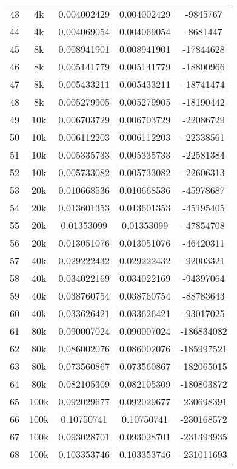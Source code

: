 \begin{center}
\begin{longtable}{|c|c|c|c|c|}
		43 & 4k & 0.004002429 & 0.004002429 & -9845767\\
		44 & 4k & 0.004069054 & 0.004069054 & -8681447\\
		\hline
		45 & 8k & 0.008941901 & 0.008941901 & -17844628\\
		46 & 8k & 0.005141779 & 0.005141779 & -18800966\\
		47 & 8k & 0.005433211 & 0.005433211 & -18741474\\
		48 & 8k & 0.005279905 & 0.005279905 & -18190442\\
		\hline
		49 & 10k & 0.006703729 & 0.006703729 & -22086729\\
		50 & 10k & 0.006112203 & 0.006112203 & -22338561\\
		51 & 10k & 0.005335733 & 0.005335733 & -22581384\\
		52 & 10k & 0.005733082 & 0.005733082 & -22606313\\
		\hline
		53 & 20k & 0.010668536 & 0.010668536 & -45978687\\
		54 & 20k & 0.013601353 & 0.013601353 & -45195405\\
		55 & 20k & 0.01353099 & 0.01353099 & -47854708\\
		56 & 20k & 0.013051076 & 0.013051076 & -46420311\\
		\hline
		57 & 40k & 0.029222432 & 0.029222432 & -92003321\\
		58 & 40k & 0.034022169 & 0.034022169 & -94397064\\
		59 & 40k & 0.038760754 & 0.038760754 & -88783643\\
		60 & 40k & 0.033626421 & 0.033626421 & -93017025\\
		\hline
		61 & 80k & 0.090007024 & 0.090007024 & -186834082\\
		62 & 80k & 0.086002076 & 0.086002076 & -185997521\\
		63 & 80k & 0.073560867 & 0.073560867 & -182065015\\
		64 & 80k & 0.082105309 & 0.082105309 & -180803872\\
		\hline
		65 & 100k & 0.092029677 & 0.092029677 & -230698391\\
		66 & 100k & 0.10750741 & 0.10750741 & -230168572\\
		67 & 100k & 0.093028701 & 0.093028701 & -231393935\\
		68 & 100k & 0.103353746 & 0.103353746 & -231011693\\
	\end{longtable}
\end{center}
